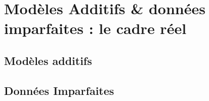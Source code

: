 \chapter{Modèles Additifs \& données imparfaites : le cadre réel}
{    
    \minitoc%
    \setcounter{page}{1}
    
    \section{Modèles additifs}
    
    \section{Données Imparfaites}
    
}